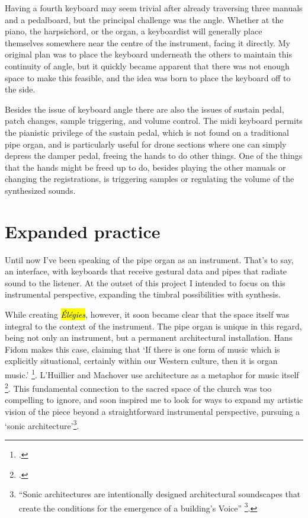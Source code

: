 \documentclass[12pt,twoside,maitrise]{dms_ks}
\theoremstyle{definition}
\begin{document}
{Having a fourth keyboard may seem trivial after already traversing three manuals and a pedalboard, but the principal challenge was the angle. 
Whether at the piano, the harpsichord, or the organ, a keyboardist will generally place themselves somewhere near the centre of the instrument, facing it directly. 
My original plan was to place the keyboard underneath the others to maintain this continuity of angle, but it quickly became apparent that there was not enough space to make this feasible, and the idea was born to place the keyboard off to the side. 

Besides the issue of keyboard angle there are also the issues of sustain pedal, patch changes, sample triggering, and volume control. 
The midi keyboard permits the pianistic privilege of the sustain pedal, which is not found on a traditional pipe organ, and is particularly useful for drone sections where one can simply depress the damper pedal, freeing the hands to do other things. 
One of the things that the hands might be freed up to do, besides playing the other manuals or changing the registrations, is triggering samples or regulating the volume of the synthesized sounds. 

\section{Expanded practice}

Until now I've been speaking of the pipe organ as an instrument. 
That's to say, an interface, with keyboards that receive gestural data and pipes that radiate sound to the listener. 
At the outset of this project I intended to focus on this instrumental perspective, expanding the timbral possibilities with synthesis.

While creating \hl{\textit{Élégies}}, however, it soon became clear that the space itself was integral to the context of the instrument. 
The pipe organ is unique in this regard, being not only an instrument, but a permanent architectural installation. 
Hans Fidom makes this case, claiming that `If there is one form of music which is explicitly situational, certainly within our Western culture, then it is organ music.' \footcite[23]{fidom_music_2012}. 
L'Huillier and Machover use architecture as a metaphor for music itself \footcite[361]{lhuillier_spaces_2018}. 
This fundamental connection to the sacred space of the church was too compelling to ignore, and soon inspired me to look for ways to expand my artistic vision of the piece beyond a straightforward instrumental perspective, pursuing a `sonic architecture'\footnote{“Sonic architectures are intentionally designed architectural soundscapes that create the conditions for the emergence of a building’s Voice” \footcite[2]{lacey_site-specific_2014}.}.

}
\end{document}
